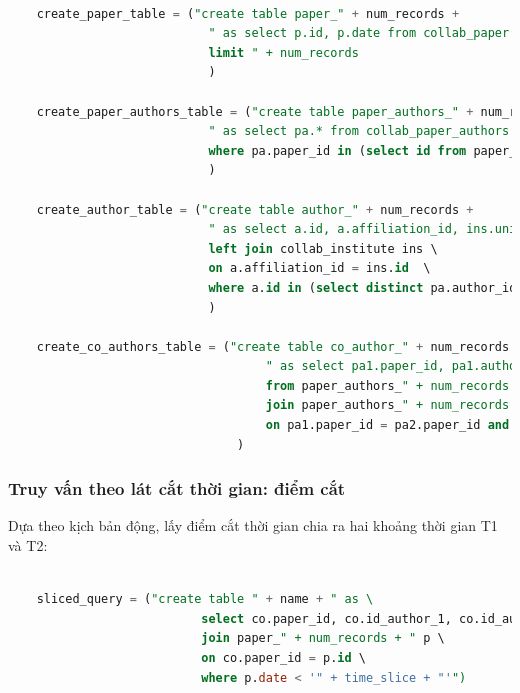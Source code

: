 \documentclass{article}
\begin{document}
\begin{lstlisting}[language=SQL, caption=Truy vấn giới hạn số lượng]

	create_paper_table = ("create table paper_" + num_records + 
                            " as select p.id, p.date from collab_paper p \
                            limit " + num_records
                            )

	create_paper_authors_table = ("create table paper_authors_" + num_records + 
                            " as select pa.* from collab_paper_authors pa \
                            where pa.paper_id in (select id from paper_" + num_records + ")"
                            )

	create_author_table = ("create table author_" + num_records + 
                            " as select a.id, a.affiliation_id, ins.university, a.country_id from collab_author a \
                            left join collab_institute ins \
                            on a.affiliation_id = ins.id  \
                            where a.id in (select distinct pa.author_id from paper_authors_" + num_records + " pa)"
                            )       

	create_co_authors_table = ("create table co_author_" + num_records +
                                    " as select pa1.paper_id, pa1.author_id as id_author_1, pa2.author_id as id_author_2 \
                                    from paper_authors_" + num_records + " pa1 \
                                    join paper_authors_" + num_records + " pa2 \
                                    on pa1.paper_id = pa2.paper_id and pa1.author_id < pa2.author_id order by pa1.paper_id"
                                )       


\end{lstlisting}

\subsubsection{Truy vấn theo lát cắt thời gian: điểm cắt}

\indent Dựa theo kịch bản động, lấy điểm cắt thời gian chia ra hai khoảng thời gian T1 và T2:

\begin{lstlisting}[language=SQL, caption=Truy vấn theo lát cắt thời gian: điểm cắt]

	sliced_query = ("create table " + name + " as \
                           select co.paper_id, co.id_author_1, co.id_author_2 from co_author_" + num_records + " co \
                           join paper_" + num_records + " p \
                           on co.paper_id = p.id \
                           where p.date < '" + time_slice + "'")


\end{lstlisting}
\end{document}
